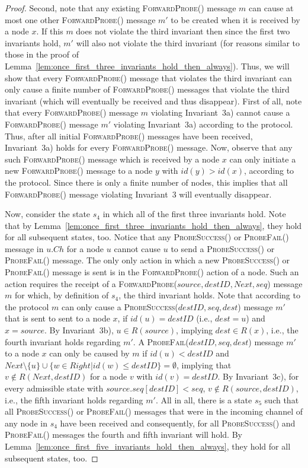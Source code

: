 \documentclass[a4paper,USenglish]{lipics}
\newcommand{\forwardprobe}[1]{\textsc{ForwardProbe(\ensuremath{#1})}\xspace}
\newcommand{\psuccess}[1]{\textsc{ProbeSuccess(\ensuremath{#1})}\xspace}
\newcommand{\pfail}[1]{\textsc{ProbeFail(\ensuremath{#1})}\xspace}
\begin{document}
\begin{proof}
Second, note that any existing \forwardprobe{} message $m$ can cause at most one other \forwardprobe{} message $m'$ to be created when it is received by a node $x$.
If this $m$ does not violate the third invariant then since the first two invariants hold, $m'$ will also not violate the third invariant (for reasons similar to those in the proof of Lemma~\ref{lem:once_first_three_invariants_hold_then_always}).
Thus, we will show that every \forwardprobe{} message that violates the third invariant can only cause a finite number of \forwardprobe{} messages that violate the third invariant (which will eventually be received and thus disappear).
First of all, note that every \forwardprobe{} message $m$ violating Invariant~3a) cannot cause a \forwardprobe{} message $m'$ violating Invariant~3a) according to the protocol.
Thus, after all initial \forwardprobe{} messages have been received, Invariant~3a) holds for every \forwardprobe{} message.
Now, observe that any such \forwardprobe{} message which is received by a node $x$ can only initiate a new \forwardprobe{} message to a node $y$ with $id(y) > id(x)$, according to the protocol.
Since there is only a finite number of nodes, this implies that all \forwardprobe{} message violating Invariant~3 will eventually disappear.

Now, consider the state $s_4$ in which all of the first three invariants hold.
Note that by Lemma~\ref{lem:once_first_three_invariants_hold_then_always}, they hold for all subsequent states, too.
Notice that any \psuccess{} or \pfail{} message in $u.Ch$ for a node $u$ cannot cause $u$ to send a \psuccess{} or \pfail{} message.
The only only action in which a new \psuccess{} or \pfail{} message is sent is in the \forwardprobe{} action of a node.
Such an action requires the receipt of a \forwardprobe{source,destID,Next,seq} message $m$ for which, by definition of $s_4$, the third invariant holds.
Note that according to the protocol $m$ can only cause a \psuccess{destID,seq,dest} message $m'$ that is sent to sent to a node $x$, if $id(u) = destID$ (i.e., $dest = u$) and $x = source$.
By Invariant~3b), $u \in R(source)$, implying $dest \in R(x)$, i.e., the fourth invariant holds regarding $m'$.
A \pfail{destID,seq,dest} message $m'$ to a node $x$ can only be caused by $m$ if $id(u) < destID$ and $Next \setminus \{u\} \cup \{w \in Right| id(w) \leq destID\} = \emptyset$, implying that $v \notin R(Next,destID)$ for a node $v$ with $id(v) = destID$.
By Invariant~3c), for every admissible state with $source.seq[destID] < seq$, $v \notin R(source,destID)$, i.e., the fifth invariant holds regarding $m'$.
All in all, there is a state $s_5$ such that all \psuccess{} or \pfail{} messages that were in the incoming channel of any node in $s_4$ have been received and consequently, for all \psuccess{} and \pfail{} messages the fourth and fifth invariant will hold.
By Lemma~\ref{lem:once_first_five_invariants_hold_then_always}, they hold for all subsequent states, too.


\end{proof}
\end{document}
